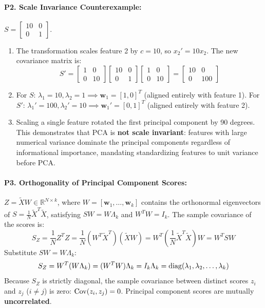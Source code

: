 \paragraph{P2. Scale Invariance Counterexample:}
$S = \begin{bmatrix} 10 & 0 \\ 0 & 1 \end{bmatrix}$.
\begin{enumerate}[label=(\alph*)]
    \item The transformation scales feature 2 by $c = 10$, so $x_2' = 10x_2$.
    The new covariance matrix is:
    \[
    S' = \begin{bmatrix} 1 & 0 \\ 0 & 10 \end{bmatrix} \begin{bmatrix} 10 & 0 \\ 0 & 1 \end{bmatrix} \begin{bmatrix} 1 & 0 \\ 0 & 10 \end{bmatrix} = \begin{bmatrix} 10 & 0 \\ 0 & 100 \end{bmatrix}
    \]
    \item For $S$: $\lambda_1 = 10, \lambda_2 = 1 \implies \mathbf{w}_1 = [1, 0]^T$ (aligned entirely with feature 1).
    For $S'$: $\lambda_1' = 100, \lambda_2' = 10 \implies \mathbf{w}_1' = [0, 1]^T$ (aligned entirely with feature 2).
    \item Scaling a single feature rotated the first principal component by 90 degrees. This demonstrates that PCA is \textbf{not scale invariant}: features with large numerical variance dominate the principal components regardless of informational importance, mandating standardizing features to unit variance before PCA.
\end{enumerate}

\paragraph{P3. Orthogonality of Principal Component Scores:}
$Z = \tilde{X} W \in \mathbb{R}^{N \times k}$, where $W = [\mathbf{w}_1, \dots, \mathbf{w}_k]$ contains the orthonormal eigenvectors of $S = \frac{1}{N}\tilde{X}^T \tilde{X}$, satisfying $S W = W \Lambda_k$ and $W^T W = I_k$.
The sample covariance of the scores is:
\begin{equation*}
S_Z = \frac{1}{N} Z^T Z = \frac{1}{N} (W^T \tilde{X}^T) (\tilde{X} W) = W^T \left( \frac{1}{N}\tilde{X}^T \tilde{X} \right) W = W^T S W
\end{equation*}
Substitute $S W = W \Lambda_k$:
\begin{equation*}
S_Z = W^T (W \Lambda_k) = (W^T W) \Lambda_k = I_k \Lambda_k = \operatorname{diag}(\lambda_1, \lambda_2, \dots, \lambda_k)
\end{equation*}
Because $S_Z$ is strictly diagonal, the sample covariance between distinct scores $z_i$ and $z_j$ ($i \ne j$) is zero: $\operatorname{Cov}(z_i, z_j) = 0$. Principal component scores are mutually \textbf{uncorrelated}.


